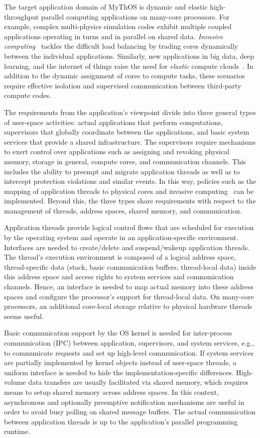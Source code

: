 The target application domain of MyThOS is dynamic and elastic high-throughput parallel 
computing applications on many-core processors. 
%
For example, complex multi-physics simulation codes exhibit multiple coupled applications operating in turns and in parallel on shared data. \emph{Invasive computing}~\cite{InvasiveComputing,octopos} tackles the difficult load balancing by trading cores dynamically between the individual applications.
%
Similarly, new applications in big data, deep learning, and the internet of things raise the need for \emph{elastic} compute clouds~\cite{Rhoden:2011:IPE:2038916.2038941}. In addition to the dynamic assignment of cores to compute tasks, these scenarios require effective isolation and supervised communication between third-party compute codes.

The requirements from the application's viewpoint divide into three general
types of user-space activities: actual applications that perform computations,
supervisors that globally coordinate between the applications, and basic system
services that provide a shared infrastructure.
The supervisors require mechanisms to exert control over applications such as
assigning and revoking physical memory, storage in general, compute cores, and communication channels.
This includes the ability to preempt and migrate application threads as well as 
to intercept protection violations and similar events. In this way, 
policies such as the mapping of application threads to physical cores and invasive computing~\cite{InvasiveComputing} can be implemented.
Beyond this, the three types share requirements with respect to the management
of threads, address spaces, shared memory, and communication.

Application threads provide logical control flows that are scheduled for 
execution by the operating system and operate in an application-specific 
environment.
Interfaces are needed to create/delete and 
suspend/wakeup application threads.
The thread's execution environment is composed of a logical address space, 
thread-specific data (stack, basic communication buffers, thread-local data) 
inside this address space and access rights to system services and 
communication channels.    
Hence, an interface is needed to map actual memory into these address spaces and configure the processor's support for thread-local data.
On many-core processors, an additional core-local storage relative to 
physical hardware threads seems useful.

Basic communication support by the OS kernel is needed for inter-process communication (IPC) between application, supervisors, and system services, e.g., to communicate requests and set up high-level communication.
If system services are partially implemented by kernel objects instead of user-space threads, a uniform interface is needed to hide the implementation-specific differences.  
High-volume data transfers are usually facilitated via shared memory, which requires means to setup shared memory across address spaces.
In this context, asynchronous and optionally preemptive notification mechanisms
are useful in order to avoid busy polling on shared message buffers.
The actual communication between application threads is up to the application's parallel programming runtime. 

